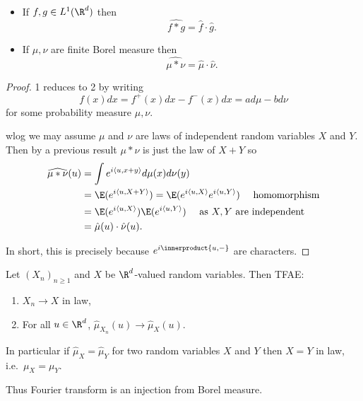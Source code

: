 \documentclass[a4paper]{article}
\newcommand*{\ip}{\innerproduct} %
\begin{document}
\begin{proposition}\leavevmode
  \begin{itemize}
  \item If \(f, g \in L^1(\R^d)\) then
    \[
      \widehat{f * g} = \hat f \cdot \hat g.
    \]
  \item If \(\mu, \nu\) are finite Borel measure then
    \[
      \widehat{\mu * \nu} = \hat \mu \cdot \hat \nu.
    \]
  \end{itemize}
\end{proposition}

\begin{proof}
  1 reduces to 2 by writing
  \[
    f(x) dx = f^+(x) dx - f^-(x) dx = a d\mu - b d\nu
  \]
  for some probability measure \(\mu, \nu\).

  wlog we may assume \(\mu\) and \(\nu\) are laws of independent random variables \(X\) and \(Y\). Then by a previous result \(\mu * \nu\) is just the law of \(X + Y\) so
  \begin{align*}
    \widehat{\mu * \nu}(u)
    &= \int e^{i \langle u, x + y \rangle} d\mu(x) d\nu(y) \\
    &= \E(e^{i \langle u, X + Y \rangle}) = \E(e^{i \langle u, X \rangle} e^{i \langle u, Y \rangle}) \quad \text{ homomorphism} \\
    &= \E(e^{i \langle u, X \rangle}) \E(e^{i \langle u, Y \rangle}) \quad \text{ as \(X, Y\) are independent} \\
    &= \hat \mu(u) \cdot \hat \nu(u).
  \end{align*}

  In short, this is precisely because \(e^{i \ip{u, -}}\) are characters.
\end{proof}

\begin{theorem}
  Let \((X_n)_{n \geq 1}\) and \(X\) be \(\R^d\)-valued random variables. Then TFAE:
  \begin{enumerate}
  \item \(X_n \to X\) in law,
  \item For all \(u \in \R^d\), \(\hat \mu_{X_n}(u) \to \hat \mu_X(u)\).
  \end{enumerate}
  In particular if \(\hat \mu_X = \hat \mu_Y\) for two random variables \(X\) and \(Y\) then \(X = Y\) in law, i.e.\ \(\mu_X = \mu_Y\).
\end{theorem}

Thus Fourier transform is an injection from Borel measure.
\end{document}
